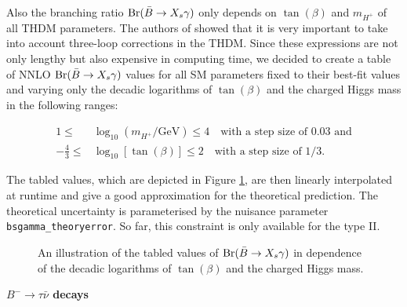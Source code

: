 \documentclass[preprint,3p,12pt]{elsarticle}
\begin{document}
{Also the branching ratio ${\rm Br}(\bar{B}\to X_s\gamma)$ only depends on $\tan (\beta)$ and $m_{H^+}$ of all THDM parameters. The authors of \cite{Misiak:2015xwa} showed that it is very important to take into account three-loop corrections in the THDM. Since these expressions are not only lengthy but also expensive in computing time, we decided to create a table of NNLO ${\rm Br}(\bar{B}\to X_s\gamma)$ values for all SM parameters fixed to their best-fit values and varying only the decadic logarithms of $\tan (\beta)$ and the charged Higgs mass in the following ranges:

\begin{align}
 1\leq & \log_{10} (m_{H^+}/\text{GeV})\leq 4 \quad \text{with a step size of 0.03 and}\nonumber \\
 -\frac43 \leq & \log_{10} [\tan(\beta)]\leq 2 \quad \text{with a step size of 1/3.}\nonumber 
\end{align}

The tabled values, which are depicted in Figure \ref{fig:THDMbsgplot}, are then linearly interpolated at runtime and give a good approximation for the theoretical prediction. The theoretical uncertainty is parameterised by the nuisance parameter \texttt{bsgamma\_theoryerror}. So far, this constraint is only available for the type II.\\

\begin{figure}
  \centering
  \caption{An illustration of the tabled values of ${\rm Br}(\bar{B}\to X_s\gamma)$ in dependence of the decadic logarithms of $\tan (\beta)$ and the charged Higgs mass.}
  \label{fig:THDMbsgplot}
\end{figure}

\textbf{$B^-\to \tau \bar{\nu}$ decays}\\

}
\end{document}
